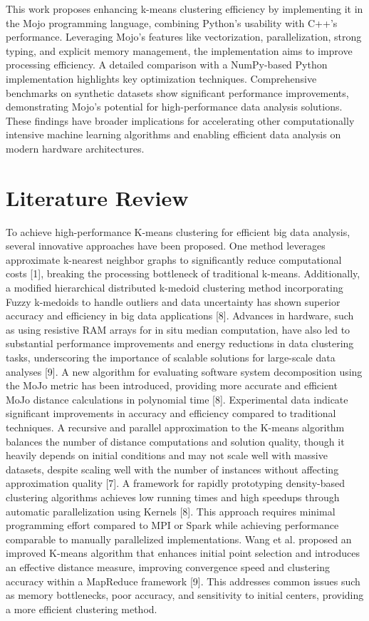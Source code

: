 \documentclass[conference]{IEEEtran}
\begin{document}
This work proposes enhancing k-means clustering efficiency by implementing it in the Mojo programming language, combining Python's usability with C++'s performance. Leveraging Mojo's features like vectorization, parallelization, strong typing, and explicit memory management, the implementation aims to improve processing efficiency. A detailed comparison with a NumPy-based Python implementation highlights key optimization techniques. Comprehensive benchmarks on synthetic datasets show significant performance improvements, demonstrating Mojo's potential for high-performance data analysis solutions. These findings have broader implications for accelerating other computationally intensive machine learning algorithms and enabling efficient data analysis on modern hardware architectures.  



\section{Literature Review}
To achieve high-performance K-means clustering for efficient big data analysis, several innovative approaches have been proposed. One method leverages approximate k-nearest neighbor graphs to significantly reduce computational costs [1], breaking the processing bottleneck of traditional k-means. Additionally, a modified hierarchical distributed k-medoid clustering method incorporating Fuzzy k-medoids to handle outliers and data uncertainty has shown superior accuracy and efficiency in big data applications [8]. Advances in hardware, such as using resistive RAM arrays for in situ median computation, have also led to substantial performance improvements and energy reductions in data clustering tasks, underscoring the importance of scalable solutions for large-scale data analyses [9].
A new algorithm for evaluating software system decomposition using the MoJo metric has been introduced, providing more accurate and efficient MoJo distance calculations in polynomial time [8]. Experimental data indicate significant improvements in accuracy and efficiency compared to traditional techniques.
A recursive and parallel approximation to the K-means algorithm balances the number of distance computations and solution quality, though it heavily depends on initial conditions and may not scale well with massive datasets, despite scaling well with the number of instances without affecting approximation quality [7].
A framework for rapidly prototyping density-based clustering algorithms achieves low running times and high speedups through automatic parallelization using Kernels [8]. This approach requires minimal programming effort compared to MPI or Spark while achieving performance comparable to manually parallelized implementations.
Wang et al. proposed an improved K-means algorithm that enhances initial point selection and introduces an effective distance measure, improving convergence speed and clustering accuracy within a MapReduce framework [9]. This addresses common issues such as memory bottlenecks, poor accuracy, and sensitivity to initial centers, providing a more efficient clustering method.
\end{document}
